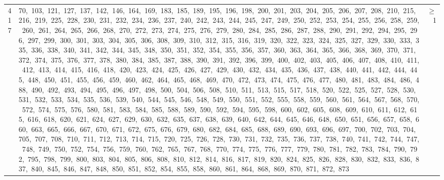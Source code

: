 \begin{longtable}{c|p{}|r}
417 & 70,\ 103,\ 121,\ 127,\ 137,\ 142,\ 146,\ 164,\ 169,\ 183,\ 185,\ 189,\ 195,\ 196,\ 198,\ 200,\ 201,\ 203,\ 204,\ 205,\ 206,\ 207,\ 208,\ 210,\ 215,\ 216,\ 219,\ 225,\ 228,\ 230,\ 231,\ 232,\ 234,\ 236,\ 237,\ 240,\ 242,\ 243,\ 244,\ 245,\ 247,\ 249,\ 250,\ 252,\ 253,\ 254,\ 255,\ 256,\ 258,\ 259,\ 260,\ 261,\ 264,\ 265,\ 266,\ 268,\ 270,\ 272,\ 273,\ 274,\ 275,\ 276,\ 279,\ 280,\ 284,\ 285,\ 286,\ 287,\ 288,\ 290,\ 291,\ 292,\ 294,\ 295,\ 296,\ 297,\ 299,\ 300,\ 301,\ 303,\ 304,\ 305,\ 306,\ 308,\ 309,\ 310,\ 312,\ 315,\ 316,\ 319,\ 320,\ 322,\ 323,\ 324,\ 325,\ 327,\ 329,\ 330,\ 333,\ 335,\ 336,\ 338,\ 340,\ 341,\ 342,\ 344,\ 345,\ 348,\ 350,\ 351,\ 352,\ 354,\ 355,\ 356,\ 357,\ 360,\ 363,\ 364,\ 365,\ 366,\ 368,\ 369,\ 370,\ 371,\ 372,\ 374,\ 375,\ 376,\ 377,\ 378,\ 380,\ 384,\ 385,\ 387,\ 388,\ 390,\ 391,\ 392,\ 396,\ 399,\ 400,\ 402,\ 403,\ 405,\ 406,\ 407,\ 408,\ 410,\ 411,\ 412,\ 413,\ 414,\ 415,\ 416,\ 418,\ 420,\ 423,\ 424,\ 425,\ 426,\ 427,\ 429,\ 430,\ 432,\ 434,\ 435,\ 436,\ 437,\ 438,\ 440,\ 441,\ 442,\ 444,\ 445,\ 448,\ 450,\ 451,\ 455,\ 456,\ 459,\ 460,\ 462,\ 464,\ 465,\ 468,\ 469,\ 470,\ 472,\ 473,\ 474,\ 475,\ 476,\ 477,\ 480,\ 481,\ 483,\ 484,\ 486,\ 488,\ 490,\ 492,\ 493,\ 494,\ 495,\ 496,\ 497,\ 498,\ 500,\ 504,\ 506,\ 508,\ 510,\ 511,\ 513,\ 515,\ 517,\ 518,\ 520,\ 522,\ 525,\ 527,\ 528,\ 530,\ 531,\ 532,\ 533,\ 534,\ 535,\ 536,\ 539,\ 540,\ 544,\ 545,\ 546,\ 548,\ 549,\ 550,\ 551,\ 552,\ 555,\ 558,\ 559,\ 560,\ 561,\ 564,\ 567,\ 568,\ 570,\ 572,\ 574,\ 575,\ 576,\ 580,\ 581,\ 583,\ 584,\ 585,\ 588,\ 589,\ 590,\ 592,\ 594,\ 595,\ 598,\ 600,\ 602,\ 605,\ 608,\ 609,\ 610,\ 611,\ 612,\ 615,\ 616,\ 618,\ 620,\ 621,\ 624,\ 627,\ 629,\ 630,\ 632,\ 635,\ 637,\ 638,\ 639,\ 640,\ 642,\ 644,\ 645,\ 646,\ 648,\ 650,\ 651,\ 656,\ 657,\ 658,\ 660,\ 663,\ 665,\ 666,\ 667,\ 670,\ 671,\ 672,\ 675,\ 676,\ 679,\ 680,\ 682,\ 684,\ 685,\ 688,\ 689,\ 690,\ 693,\ 696,\ 697,\ 700,\ 702,\ 703,\ 704,\ 705,\ 707,\ 708,\ 710,\ 711,\ 712,\ 713,\ 714,\ 715,\ 720,\ 725,\ 726,\ 728,\ 730,\ 731,\ 732,\ 735,\ 736,\ 737,\ 738,\ 740,\ 741,\ 742,\ 744,\ 747,\ 748,\ 749,\ 750,\ 752,\ 754,\ 756,\ 759,\ 760,\ 762,\ 765,\ 767,\ 768,\ 770,\ 774,\ 775,\ 776,\ 777,\ 779,\ 780,\ 781,\ 782,\ 783,\ 784,\ 790,\ 792,\ 795,\ 798,\ 799,\ 800,\ 803,\ 804,\ 805,\ 806,\ 808,\ 810,\ 812,\ 814,\ 816,\ 817,\ 819,\ 820,\ 824,\ 825,\ 826,\ 828,\ 830,\ 832,\ 833,\ 836,\ 837,\ 840,\ 845,\ 846,\ 847,\ 848,\ 850,\ 851,\ 852,\ 854,\ 855,\ 858,\ 860,\ 861,\ 864,\ 868,\ 869,\ 870,\ 871,\ 872,\ 873 & $\ge$ 1 \\

\end{longtable}
